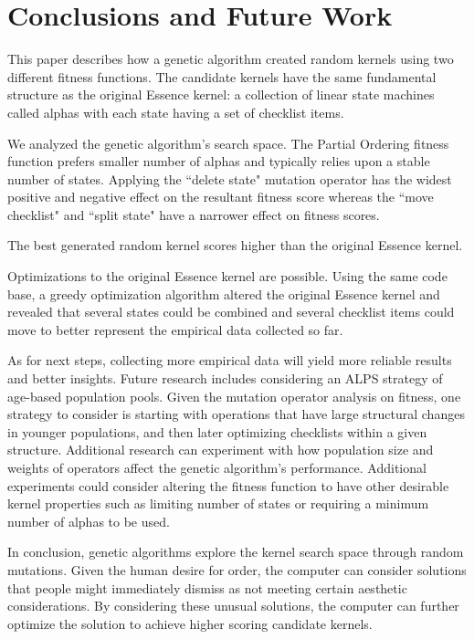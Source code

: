 \documentclass[conference]{IEEEtran}
\begin{document}
\section{Conclusions and Future Work}

This paper describes how a genetic algorithm created random kernels using two different fitness functions. The candidate kernels have the same fundamental structure as the original Essence kernel: a collection of linear state machines called alphas with each state having a set of checklist items. 

We analyzed the genetic algorithm's search space. The Partial Ordering fitness function prefers smaller number of alphas and typically relies upon a stable number of states. Applying the ``delete state" mutation operator has the widest positive and negative effect on the resultant fitness score whereas the ``move checklist" and ``split state" have a narrower effect on fitness scores. 

The best generated random kernel scores higher than the original Essence kernel. 

Optimizations to the original Essence kernel are possible. Using the same code base, a greedy optimization algorithm altered the original Essence kernel and revealed that several states could be combined and several checklist items could move to better represent the empirical data collected so far.

As for next steps, collecting more empirical data will yield more reliable results and better insights. Future research includes considering an ALPS strategy \cite{ALPS} of age-based population pools. Given the mutation operator analysis on fitness, one strategy to consider is starting with operations that have large structural changes in younger populations, and then later optimizing checklists within a given structure. Additional research can experiment with how population size and weights of operators affect the genetic algorithm's performance. Additional experiments could consider altering the fitness function to have other desirable kernel properties such as limiting number of states or requiring a minimum number of alphas to be used.

In conclusion, genetic algorithms explore the kernel search space through random mutations. Given the human desire for order, the computer can consider solutions that people might immediately dismiss as not meeting certain aesthetic considerations. By considering these unusual solutions, the computer can further optimize the solution to achieve higher scoring candidate kernels. 
\end{document}

